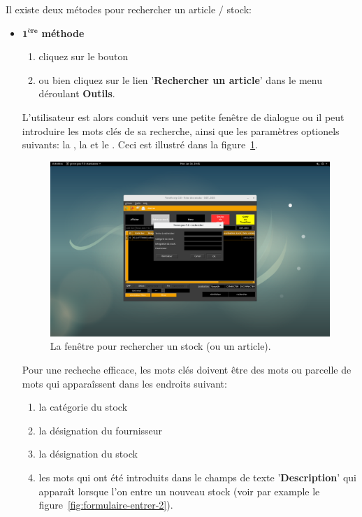 Il existe deux m\'etodes pour rechercher un article / stock:
\begin{itemize}[]
	\item \textcolor{purplish}{$\mathbf{1^{\text{\`ere}}}$ \textbf{m\'ethode}}

	\begin{enumerate}[1)]
		\item cliquez sur le bouton 
		\item ou bien cliquez sur le lien '\textbf{Rechercher un article}'
			dans le menu d\'eroulant \textbf{Outils}.\\
	\end{enumerate}
	
	L'utilisateur est alors conduit vers une petite fen\^etre de
	dialogue ou il peut introduire les mots cl\'es de sa recherche,
	ainsi que les param\`etres optionels suivants: la
	, la 
	et le .
	Ceci est illustr\'e dans la figure~\ref{fig:fenetre-rechercher-stock}.\\
	
	\begin{figure}[!htbp]
		\centering
		\includegraphics[scale=0.26]{images/yeren-rechercher-un-article.png}
		\caption{La fen\^etre pour rechercher un stock (ou un article).}
		\label{fig:fenetre-rechercher-stock}
	\end{figure}
	
	Pour une recheche efficace, les mots cl\'es doivent \^etre des
	mots ou parcelle de mots qui appara\^issent dans les endroits
	suivant:
	\begin{enumerate}[1)]
		\item la cat\'egorie du stock
		\item la d\'esignation du fournisseur		
		\item la d\'esignation du stock
		\item les mots qui ont \'et\'e introduits dans
			le champs de texte '\textbf{Description}'
			qui appara\^it lorsque l'on entre un nouveau stock
			(voir par example le figure~\ref{fig:formulaire-entrer-2}).
	\end{enumerate}
		

\end{itemize}
